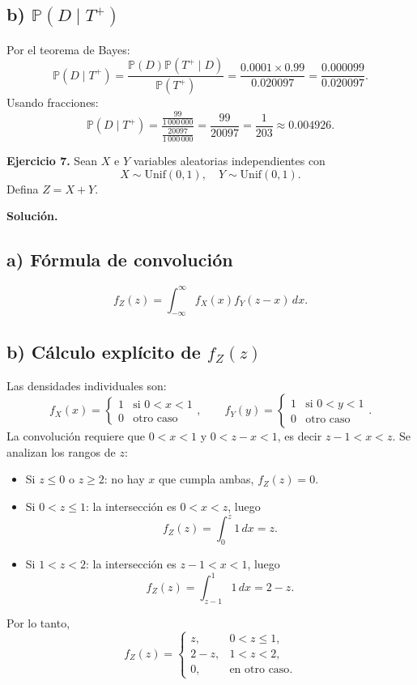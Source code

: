 \documentclass[letterpaper, 12pt]{article}
\begin{document}
    \subsection*{b) \(\mathbb{P}(D \mid T^+)\)}
    Por el teorema de Bayes:
    \[
    \mathbb{P}(D \mid T^+) = \frac{\mathbb{P}(D)\mathbb{P}(T^+\mid D)}{\mathbb{P}(T^+)}
    = \frac{0.0001\times0.99}{0.020097} = \frac{0.000099}{0.020097}.
    \]
    Usando fracciones:
    \[
    \mathbb{P}(D \mid T^+) = \frac{\frac{99}{1\,000\,000}}{\frac{20097}{1\,000\,000}} = \frac{99}{20097}
    = \frac{1}{203} \approx 0.004926.
    \]

    \newpage

    \textbf{Ejercicio 7.} Sean \( X \) e \( Y \) variables aleatorias independientes con
    \[
    X \sim \text{Unif}(0,1), \quad Y \sim \text{Unif}(0,1).
    \]
    Defina \( Z = X + Y \).

    \textbf{Solución.}

    \subsection*{a) Fórmula de convolución}
    \[
    f_Z(z) = \int_{-\infty}^{\infty} f_X(x) f_Y(z - x) \, dx.
    \]

    \subsection*{b) Cálculo explícito de \(f_Z(z)\)}
    Las densidades individuales son:
    \[
    f_X(x) = \begin{cases} 1 & \text{si } 0 < x < 1 \\ 0 & \text{otro caso} \end{cases}, \qquad
    f_Y(y) = \begin{cases} 1 & \text{si } 0 < y < 1 \\ 0 & \text{otro caso} \end{cases}.
    \]
    La convolución requiere que \(0 < x < 1\) y \(0 < z-x < 1\), es decir \(z-1 < x < z\). Se analizan los rangos de \(z\):

    \begin{itemize}
    \item Si \(z \le 0\) o \(z \ge 2\): no hay \(x\) que cumpla ambas, \(f_Z(z)=0\).
    \item Si \(0 < z \le 1\): la intersección es \(0 < x < z\), luego
    \[
    f_Z(z) = \int_0^z 1 \, dx = z.
    \]
    \item Si \(1 < z < 2\): la intersección es \(z-1 < x < 1\), luego
    \[
    f_Z(z) = \int_{z-1}^1 1 \, dx = 2 - z.
    \]
    \end{itemize}
    Por lo tanto,
    \[
    f_Z(z) = 
    \begin{cases}
    z, & 0 < z \le 1,\\
    2 - z, & 1 < z < 2,\\
    0, & \text{en otro caso}.
    \end{cases}
    \]
\end{document}
